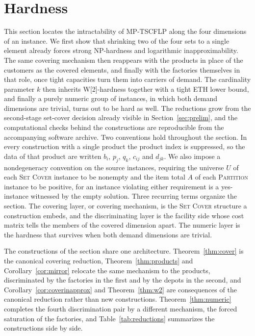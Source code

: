 \section{Hardness}\label{sec:complexity}

This section locates the intractability of MP-TSCFLP along the four
dimensions of an instance. We first show that shrinking two of the four sets to a single element
already forces strong NP-hardness and logarithmic inapproximability.
The same covering mechanism then reappears with the products in place
of the customers as the covered elements, and finally with the
factories themselves in that role, once tight capacities turn them
into carriers of demand. The
cardinality parameter $k$ then inherits W[2]-hardness together with a
tight ETH lower bound, and finally a purely numeric group of instances,
in which both demand dimensions are trivial, turns out to be hard as
well. The reductions grow from the second-stage
set-cover decision already visible in Section~\ref{sec:prelim}, and the computational checks behind the constructions are reproducible
from the accompanying software archive. Two conventions hold throughout
the section. In every construction with a single product the product
index is suppressed, so the data of that product are written $b_i$,
$p_j$, $q_k$, $c_{ij}$ and $d_{jk}$. We also impose a nondegeneracy
convention on the source instances, requiring the universe $U$ of each
\textsc{Set Cover} instance to be nonempty and the item total $A$ of
each \textsc{Partition} instance to be positive, for an instance
violating either requirement is a yes-instance witnessed by the empty
solution. Three recurring terms organize the section. The covering
layer, or covering mechanism, is the \textsc{Set Cover} structure a
construction embeds, and the discriminating layer is the facility side
whose cost matrix tells the members of the covered dimension apart. The
numeric layer is the hardness that survives when both demand dimensions
are trivial.

The constructions of the section share one architecture.
Theorem~\ref{thm:cover} is the canonical covering reduction,
Theorem~\ref{thm:products} and Corollary~\ref{cor:mirror} relocate the
same mechanism to the products, discriminated by the factories in the
first and by the depots in the second, and
Corollary~\ref{cor:coverinapprox} and Theorem~\ref{thm:w2} are
consequences of the canonical reduction rather than new constructions.
Theorem~\ref{thm:numeric} completes the fourth discrimination pair by a
different mechanism, the forced saturation of the factories, and
Table~\ref{tab:reductions} summarizes the constructions side by side.

